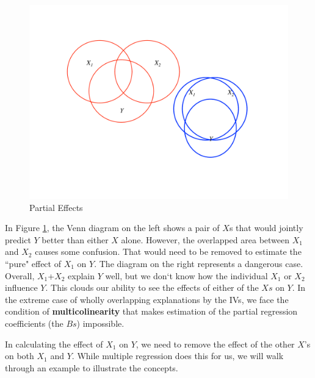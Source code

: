 \documentclass[11pt,openany]{book}\usepackage[]{graphicx}\usepackage[]{color}
\begin{document}
\begin{figure}
  \centering
  \includegraphics[width=5in]{12_LogicMult/partef.pdf}
  \caption{Partial Effects \label{fig:partef}}
\end{figure}

In Figure \ref{fig:partef}, the Venn diagram on the left shows a pair of $X$s that would jointly predict $Y$ better than either $X$ alone. However,
the overlapped area between $X_{1}$ and $X_{2}$ causes some confusion. That would need to be removed to estimate the ``pure" effect of $X_{1}$ on $Y$. The diagram on the right represents a dangerous case. Overall, $X_{1}$+$X_2$ explain $Y$ well, but we don`t know how the individual $X_1$ or $X_2$ influence $Y$.  This clouds our ability to see the effects of either of the $Xs$ on $Y$. In the extreme case of wholly overlapping explanations by the IVs, we face the condition of \textbf{multicolinearity} that makes estimation of the partial regression coefficients (the $Bs$) impossible.
     
In calculating the effect of $X_1$ on $Y$, we need to remove the effect of the other $X$’s on both $X_1$ and $Y$.  While multiple regression does this for us, we will walk through an example to illustrate the concepts. 
\end{document}

